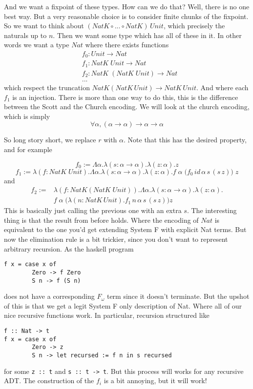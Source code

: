 \documentclass[12pt]{article}
\newcommand{\hask}{\texttt}
\begin{document}
And we want a fixpoint of these types. 
How can we do that?
Well, there is no one best way.
But a very reasonable choice is to consider finite chunks of the fixpoint. 
So we want to think about $(NatK \circ ... \circ NatK)\, Unit$, which precisely the naturals up to $n$.
Then we want some type which has all of these in it.
In other words we want a type $Nat$ where there exists functions
\begin{equation}
\begin{split}
 &f_0 : Unit \rightarrow Nat\\
 &f_1 : NatK\; Unit \rightarrow Nat\\
 &f_2 : NatK\; (NatK\; Unit) \rightarrow Nat \\
 & ...
\end{split}
\end{equation}
which respect the truncation $NatK (NatK\, Unit) \rightarrow NatK\, Unit$.
And where each $f_1$ is an injection.
There is more than one way to do this, this is the difference between the Scott and the Church encoding. 
We will look at the church encoding, which is simply 
\[
\forall \alpha, (\alpha \rightarrow \alpha) \rightarrow \alpha \rightarrow \alpha
\]

So long story short, we replace $r$ with $\alpha$.
Note that this has the desired property, and for example

\[
  f_0 := \Lambda \alpha. \lambda (s : \alpha \rightarrow \alpha). \lambda (z: \alpha). z
\]
\[
  f_1 := \lambda (f : NatK\; Unit). \Lambda \alpha. \lambda (s : \alpha \rightarrow \alpha). \lambda (z: \alpha). f \;\alpha\; \Big(f_0\,  id\,\alpha\, s\, (s\, z) \Big)\; z 
\]
and
\begin{equation}
\begin{split}
f_2 := &\lambda (f : NatK(NatK\; Unit)). \Lambda \alpha. \lambda (s : \alpha \rightarrow \alpha). \lambda (z: \alpha). \\
 & f \;\alpha\; \Big(\lambda (n : NatK\, Unit). f_1\, n\, \alpha\, s\, (s\, z)\Big) z
\end{split}
\end{equation}
This is basically just calling the previous one with an extra $s$.
The interesting thing is that the result from before holds.
Where the encoding of $Nat$ is equivalent to the one you'd get extending System F with explicit Nat terms.
But now the elimination rule is a bit trickier, since you don't want to represent arbitrary recursion. 
As the haskell program 
\begin{verbatim}
f x = case x of 
        Zero -> f Zero
        S n -> f (S n)
\end{verbatim}
does not have a corresponding $F_\omega$ term since it doesn't terminate.
But the upshot of this is that we get a legit System F only description of Nat.
Where all of our nice recursive functions work.
In particular, recursion structured like 
\begin{verbatim}
f :: Nat -> t
f x = case x of 
        Zero -> z
        S n -> let recursed := f n in s recursed
\end{verbatim}
for some \hask{z :: t} and \hask{s :: t -> t}.
But this process will works for any recursive ADT.
The construction of the $f_i$ is a bit annoying, but it will work!
\end{document}
